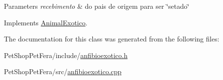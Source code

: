 \begin{DoxyParams}{Parameters}
{\em recebimento} & do pais de origem para ser \char`\"{}setado\char`\"{} \\
\hline
\end{DoxyParams}


Implements \mbox{\hyperlink{class_animal_exotico_a496013ecefb3cafb33537bb4022728e2}{Animal\+Exotico}}.



The documentation for this class was generated from the following files\+:\begin{DoxyCompactItemize}
\item 
Pet\+Shop\+Pet\+Fera/include/\mbox{\hyperlink{anfibioexotico_8h}{anfibioexotico.\+h}}\item 
Pet\+Shop\+Pet\+Fera/src/\mbox{\hyperlink{anfibioexotico_8cpp}{anfibioexotico.\+cpp}}\end{DoxyCompactItemize}

